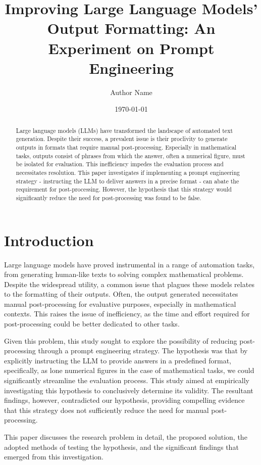 \documentclass{article}
\title{Improving Large Language Models' Output Formatting: An Experiment on Prompt Engineering}
\author{Author Name}
\date{\today}
\begin{document}
\maketitle

\begin{abstract}
Large language models (LLMs) have transformed the landscape of automated text generation. Despite their success, a prevalent issue is their proclivity to generate outputs in formats that require manual post-processing. Especially in mathematical tasks, outputs consist of phrases from which the answer, often a numerical figure, must be isolated for evaluation. This inefficiency impedes the evaluation process and necessitates resolution. This paper investigates if implementing a prompt engineering strategy - instructing the LLM to deliver answers in a precise format - can abate the requirement for post-processing. However, the hypothesis that this strategy would significantly reduce the need for post-processing was found to be false.
\end{abstract}

\section{Introduction}
Large language models have proved instrumental in a range of automation tasks, from generating human-like texts to solving complex mathematical problems. Despite the widespread utility, a common issue that plagues these models relates to the formatting of their outputs. Often, the output generated necessitates manual post-processing for evaluative purposes, especially in mathematical contexts. This raises the issue of inefficiency, as the time and effort required for post-processing could be better dedicated to other tasks.

Given this problem, this study sought to explore the possibility of reducing post-processing through a prompt engineering strategy. The hypothesis was that by explicitly instructing the LLM to provide answers in a predefined format, specifically, as lone numerical figures in the case of mathematical tasks, we could significantly streamline the evaluation process. This study aimed at empirically investigating this hypothesis to conclusively determine its validity. The resultant findings, however, contradicted our hypothesis, providing compelling evidence that this strategy does not sufficiently reduce the need for manual post-processing.

This paper discusses the research problem in detail, the proposed solution, the adopted methods of testing the hypothesis, and the significant findings that emerged from this investigation.
\end{document}
